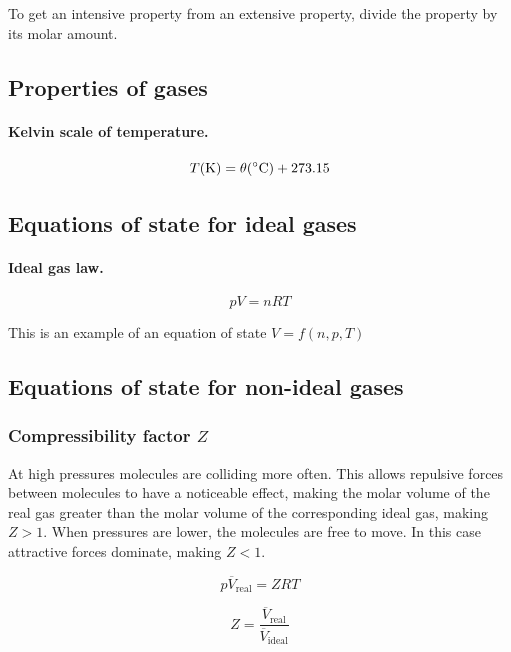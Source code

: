 \documentclass{article}
\numberwithin{theorem}{section}
\numberwithin{corollary}{section}
\numberwithin{postulate}{section}
\numberwithin{lemma}{section}
\numberwithin{definition}{section}
\begin{document}
To get an intensive property from an extensive property, divide the property by
its molar amount.

\subsection{Properties of gases}

\paragraph{Kelvin scale of temperature. }
\begin{equation}
  T(\mathrm{K}) = \theta (\mathrm{\degree C}) + 273.15
\end{equation}

\subsection{Equations of state for ideal gases}

\paragraph{Ideal gas law. }
\begin{equation}
  pV = nRT
\end{equation}

This is an example of an equation of state $V = f(n, p , T)$

\subsection{Equations of state for non-ideal gases}

\subsubsection{Compressibility factor $Z$}

At high pressures molecules are colliding more often. This allows repulsive
forces between molecules to have a noticeable effect, making the molar volume of
the real gas  greater than the molar volume of the corresponding ideal gas,
making $Z > 1$. When pressures are lower, the molecules are free to move. In this case
attractive forces dominate, making $Z < 1$.

\begin{equation}
  p \overline{V}_\mathrm{real} = ZRT
\end{equation}

\begin{equation*}
  Z = \frac{\overline{V}_\mathrm{real}}{\overline{V}_\mathrm{ideal}}
\end{equation*}
\end{document}
